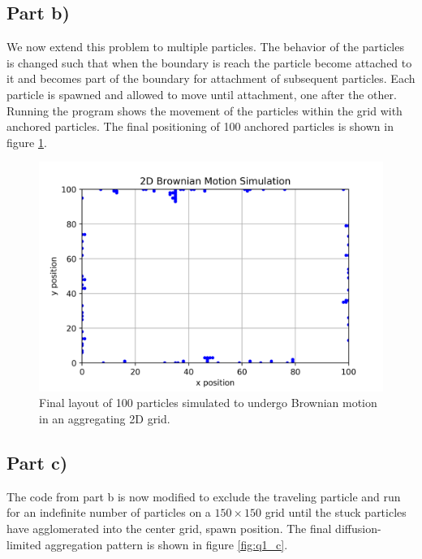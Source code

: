\documentclass{article}
\begin{document}
\subsection{Part b)}
We now extend this problem to multiple particles. The behavior of the particles is changed such that when the boundary is reach the particle become attached to it and becomes part of the boundary for attachment of subsequent particles. Each particle is spawned and allowed to move until attachment, one after the other. Running the program shows the movement of the particles within the grid with anchored particles. The final positioning of 100 anchored particles is shown in figure \ref{fig:q1_b}.

\begin{figure}[H]
	\centering
	\includegraphics[width=\linewidth]{../images/brownian_trajectories_n=100.png}
	\caption{Final layout of 100 particles simulated to undergo Brownian motion in an aggregating 2D grid.}
	\label{fig:q1_b}
\end{figure}

\subsection{Part c)}
The code from part b is now modified to exclude the traveling particle and run for an indefinite number of particles on a $150\times 150$ grid until the stuck particles have agglomerated into the center grid, spawn position. The final diffusion-limited aggregation pattern is shown in figure \ref{fig:q1_c}.
\end{document}
